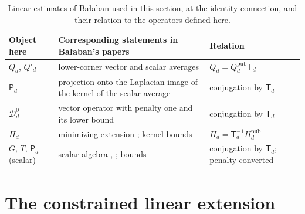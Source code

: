 \begin{table}[ht]
\centering
\small
\begin{tabular}{>{\raggedright\arraybackslash}p{2.6cm}>{\raggedright\arraybackslash}p{8.6cm}>{\raggedright\arraybackslash}p{3.6cm}}
\toprule
Object here & Corresponding statements in Bałaban's papers & Relation\\
\midrule
$Q_d$, $Q'_d$ & lower-corner vector and scalar averages \cite[(1.11), p.~19; (1.18), p.~20]{Balaban1984I} & $Q_d=Q_d^{\mathrm{pub}}\mathsf T_d$\\
$\mathsf P_d$ & projection onto the Laplacian image of the kernel of the scalar average \cite[(1.39)--(1.44), pp.~24--25]{Balaban1984I} & conjugation by $\mathsf T_d$\\
$\mathscr D_d^0$ & vector operator with penalty one and its lower bound \cite[Proposition~1.1, (1.89)--(1.90), p.~33]{Balaban1984I} & conjugation by $\mathsf T_d$\\
$H_d$ & minimizing extension \cite[(1.60)--(1.69), pp.~28--29; (1.103), p.~34]{Balaban1984I}; kernel bounds \cite[Proposition~2.7, (2.149); Corollary~2.8, (2.150) and the bound printed as (1.151), p.~249]{Balaban1984II} & $H_d=\mathsf T_d^{-1}H_d^{\mathrm{pub}}$\\
$G$, $T$, $\mathsf P_d$ (scalar) & scalar algebra \cite[(1.43)--(1.45), pp.~25--26]{Balaban1984I}, \cite[(2.17), p.~225]{Balaban1984II}; bounds \cite[Theorem~3.1, (3.42), p.~397; (3.47), p.~398; Theorem~3.2, (3.48), p.~398; (3.49), p.~399]{Balaban1985Background} & conjugation by $\mathsf T_d$; penalty converted\\
\bottomrule
\end{tabular}
\caption{Linear estimates of Bałaban used in this section, at the identity connection, and their relation to the operators defined here.}
\label{ch06:tab:balaban}
\end{table}

\section{The constrained linear extension}\label{ch06:sec:extension}


